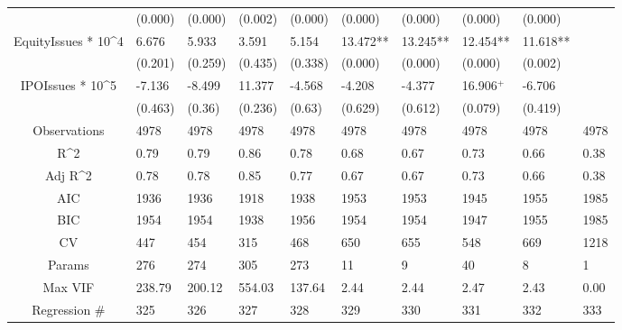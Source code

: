 \documentclass{article}
\begin{document}
\begin{table}[H]
\begin{tabular}{|clllllllll|}
   & (0.000) & (0.000) & (0.002) & (0.000) & (0.000) & (0.000) & (0.000) & (0.000) &  \\ 
  EquityIssues * 10^4 & 6.676 & 5.933 & 3.591 & 5.154 & 13.472** & 13.245** & 12.454** & 11.618** &  \\ 
   & (0.201) & (0.259) & (0.435) & (0.338) & (0.000) & (0.000) & (0.000) & (0.002) &  \\ 
  IPOIssues * 10^5 & -7.136 & -8.499 & 11.377 & -4.568 & -4.208 & -4.377 & 16.906$^{+}$ & -6.706 &  \\ 
   & (0.463) & (0.36) & (0.236) & (0.63) & (0.629) & (0.612) & (0.079) & (0.419) &  \\ 
  \hline 
 Observations & 4978 & 4978 & 4978 & 4978 & 4978 & 4978 & 4978 & 4978 & 4978 \\ 
  R^2 & 0.79 & 0.79 & 0.86 & 0.78 & 0.68 & 0.67 & 0.73 & 0.66 & 0.38 \\ 
  Adj R^2 & 0.78 & 0.78 & 0.85 & 0.77 & 0.67 & 0.67 & 0.73 & 0.66 & 0.38 \\ 
  AIC & 1936 & 1936 & 1918 & 1938 & 1953 & 1953 & 1945 & 1955 & 1985 \\ 
  BIC & 1954 & 1954 & 1938 & 1956 & 1954 & 1954 & 1947 & 1955 & 1985 \\ 
  CV & 447 & 454 & 315 & 468 & 650 & 655 & 548 & 669 & 1218 \\ 
  Params & 276 & 274 & 305 & 273 & 11 & 9 & 40 & 8 & 1 \\ 
  Max VIF & 238.79 & 200.12 & 554.03 & 137.64 & 2.44 & 2.44 & 2.47 & 2.43 & 0.00 \\ 
  Regression \# & 325 & 326 & 327 & 328 & 329 & 330 & 331 & 332 & 333 \\ 
   \hline
\end{tabular}
 
\end{table}
\end{document}

